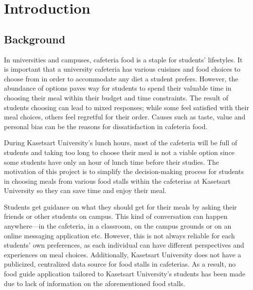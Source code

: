 \newcommand{\persona}[4]{%
    \textbf{#1}
    \small\begin{tabular}[t]{|p{.8in} | p{1.5in}|}
        \hline
        \textbf{Preferences} & #2 \\\hline
        \textbf{Pain Points} & #3 \\\hline
        \textbf{Goals} & #4 \\
        \hline
    \end{tabular}
    \vspace{4pt}
}


\chapter{Introduction}
\label{chap:introduction}

\section{Background}
\label{section:background}

In universities and campuses, cafeteria food is a staple for students' lifestyles.
It is important that a university cafeteria has various cuisines and food choices to choose from in order to accommodate
any diet a student prefers. However, the abundance of options paves way for students to spend their valuable time in choosing
their meal within their budget and time constraints. The result of students choosing can lead to mixed responses;
while some feel satisfied with their meal choices, others feel regretful for their order.
Causes such as taste, value and personal bias can be the reasons for dissatisfaction in cafeteria food. \cite{marquisetal:2018}

During Kasetsart University's lunch hours,
most of the cafeteria will be full of students and taking too long to choose their meal is not a viable option
since some students have only an hour of lunch time before their studies. The motivation of this project is to simplify
the decision-making process for students in choosing meals from various food stalls within
the cafeterias at Kasetsart University so they can save time and enjoy their meal.


Students get guidance on what they should get for their meals by asking their friends or other students on campus.
This kind of conversation can happen anywhere---in the cafeteria, in a classroom, on the campus grounds or on an online messaging application etc.
However, this is not always reliable for each students' own preferences, as each individual can have different perspectives
and experiences on meal choices. Additionally, Kasetsart University does not have a publicized, centralized data source
for food stalls in cafeterias. As a result, no food guide application tailored to Kasetsart University's students
has been made due to lack of information on the aforementioned food stalls.

